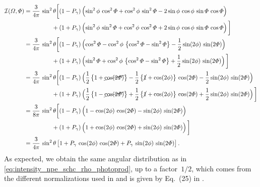 \begin{align*}
  \mathcal{I}(\Omega, \Phi)
  ={}& \begin{aligned}[t] \frac{3}{4 \pi}\, \sin^2 \theta \bigg[
         &(1 - P_\gamma) \rBrk[2]{\sin^2 \phi\, \cos^2 \Phi + \cos^2 \phi\, \sin^2 \Phi - 2 \sin \phi\, \cos \phi\, \sin \Phi\, \cos \Phi}
    \\
    {}+{}&(1 + P_\gamma) \rBrk[2]{\sin^2 \phi\, \sin^2 \Phi + \cos^2 \phi\, \cos^2 \Phi + 2 \sin \phi\, \cos \phi\, \sin \Phi\, \cos \Phi}
    \bigg]
  \end{aligned}
  \\
  ={}& \begin{aligned}[t] \frac{3}{4 \pi}\, \sin^2 \theta \bigg[
         &(1 - P_\gamma) \rBrk[2]{\cos^2 \Phi - \cos^2 \phi\, \cBrk[1]{\cos^2 \Phi - \sin^2 \Phi} - \frac{1}{2} \sin(2 \phi)\, \sin(2 \Phi)}
    \\
    {}+{}&(1 + P_\gamma) \rBrk[2]{\sin^2 \Phi + \cos^2 \phi\, \cBrk[1]{\cos^2 \Phi - \sin^2 \Phi} + \frac{1}{2} \sin(2 \phi)\, \sin(2 \Phi)}
    \bigg]
  \end{aligned}
  \\
  ={}& \begin{aligned}[t] \frac{3}{4 \pi}\, \sin^2 \theta \bigg[
         &(1 - P_\gamma) \rBrk[2]{\frac{1}{2} \cBrk[1]{1 + \cancel{\cos(2 \Phi)}} - \frac{1}{2} \cBrk[1]{\cancel{1} + \cos(2 \phi)}\, \cos(2 \Phi) - \frac{1}{2} \sin(2 \phi)\, \sin(2 \Phi)}
    \\
    {}+{}&(1 + P_\gamma) \rBrk[2]{\frac{1}{2} \cBrk[1]{1 - \cancel{\cos(2 \Phi)}} + \frac{1}{2} \cBrk[1]{\cancel{1} + \cos(2 \phi)}\, \cos(2 \Phi) + \frac{1}{2} \sin(2 \phi)\, \sin(2 \Phi)}
    \bigg]
  \end{aligned}
  \\
  ={}& \begin{aligned}[t] \frac{3}{8 \pi}\, \sin^2 \theta \bigg[
         &(1 - P_\gamma) \rBrk[2]{1 - \cos(2 \phi)\, \cos(2 \Phi) - \sin(2 \phi)\, \sin(2 \Phi)}
    \\
    {}+{}&(1 + P_\gamma) \rBrk[2]{1 + \cos(2 \phi)\, \cos(2 \Phi) + \sin(2 \phi)\, \sin(2 \Phi)}
    \bigg]
  \end{aligned}
  \\
  ={}& \frac{3}{4 \pi}\, \sin^2 \theta \sBrk{1
  + P_\gamma\, \cos(2 \phi)\, \cos(2 \Phi)
  + P_\gamma\, \sin(2 \phi)\, \sin(2 \Phi)}.
\end{align*}
As expected, we obtain the same angular distribution as in
\cref{eq:intensity_npe_schc_rho_photoprod}, up to a factor~$1 / 2$,
which comes from the different normalizations used in
 and is given by Eq.~(25) in
.

